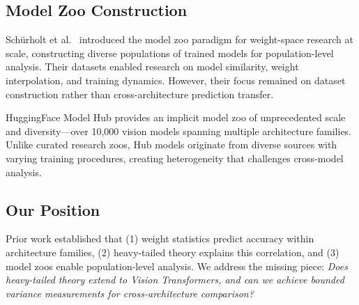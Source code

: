 \subsection{Model Zoo Construction}

Sch{\"u}rholt et al.~\cite{schurholt2022model} introduced the model zoo paradigm for weight-space research at scale, constructing diverse populations of trained models for population-level analysis. Their datasets enabled research on model similarity, weight interpolation, and training dynamics. However, their focus remained on dataset construction rather than cross-architecture prediction transfer.

HuggingFace Model Hub provides an implicit model zoo of unprecedented scale and diversity---over 10,000 vision models spanning multiple architecture families. Unlike curated research zoos, Hub models originate from diverse sources with varying training procedures, creating heterogeneity that challenges cross-model analysis.

\subsection{Our Position}

Prior work established that (1) weight statistics predict accuracy within architecture families, (2) heavy-tailed theory explains this correlation, and (3) model zoos enable population-level analysis. We address the missing piece: \emph{Does heavy-tailed theory extend to Vision Transformers, and can we achieve bounded variance measurements for cross-architecture comparison?}
